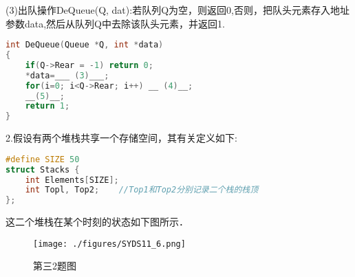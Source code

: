 (3)出队操作DeQueue(Q, dat):若队列Q为空，则返回0,否则，把队头元素存入地址参数data,然后从队列Q中去除该队头元素，并返回1.
\begin{lstlisting}[language=cpp]
int DeQueue(Queue *Q, int *data)
{
    if(Q->Rear = -1) return 0;
    *data=___ (3)___;
    for(i=0; i<Q->Rear; i++) __ (4)__;
    __(5)__;
    return 1;
}
\end{lstlisting}

2.假设有两个堆栈共享一个存储空间，其有关定义如下:
\begin{lstlisting}[language=cpp]
#define SIZE 50
struct Stacks {
    int Elements[SIZE];
    int Topl, Top2;    //Top1和Top2分别记录二个栈的栈顶
};
\end{lstlisting}
这二个堆栈在某个时刻的状态如下图所示．
\begin{figure}[ht]
\centering
\texttt{[image: ./figures/SYDS11\_6.png]}
\caption{第三2题图} \label{SYDS11_fig6}
\end{figure}
